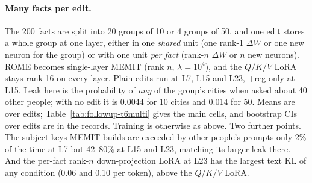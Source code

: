 \documentclass[11pt]{article}
\begin{document}
\paragraph{Many facts per edit.} The 200 facts are split into 20
groups of 10 or 4 groups of 50, and one edit stores a whole group at
one layer, either in one \emph{shared} unit (one rank-1 $\Delta W$ or
one new neuron for the group) or with one unit \emph{per fact}
(rank-$n$ $\Delta W$ or $n$ new neurons). ROME becomes single-layer
MEMIT (rank $n$, $\lambda=10^4$), and the $Q/K/V$ LoRA stays rank 16 on
every layer. Plain edits run at L7, L15 and L23, +reg only at L15. Leak
here is the probability of \emph{any} of the group's cities when asked
about 40 other people; with no edit it is 0.0044 for 10 cities and
0.014 for 50. Means are over edits; Table~\ref{tab:followup-t6multi}
gives the main cells, and bootstrap CIs over edits are in the records.
Training is otherwise as above. Two further points. The subject keys
MEMIT builds are exceeded by other people's prompts only 2\% of the
time at L7 but 42--80\% at L15 and L23, matching its larger leak
there. And the per-fact rank-$n$ down-projection LoRA at L23 has the largest text KL
of any condition (0.06 and 0.10 per token), above the $Q/K/V$ LoRA.
\end{document}
